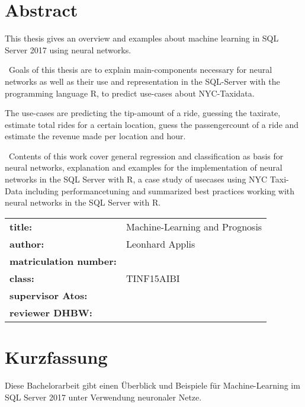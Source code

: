 \chapter*{Abstract} %
This thesis gives an overview and examples about machine learning in SQL Server 2017 using neural networks. 

~\newline Goals of this thesis are to explain main-components necessary for neural networks as well as their use and representation in the SQL-Server with the programming language R, to predict use-cases about NYC-Taxidata. 

The use-cases are predicting the tip-amount of a ride, guessing the taxirate, estimate total rides for a certain location, guess the passengercount of a ride and estimate the revenue made per location and hour.

~\newline Contents of this work cover general regression and classification as basis for neural networks, explanation and examples for the implementation of neural networks in the SQL Server with R, a case study of usecases using NYC Taxi-Data including performancetuning and summarized best practices working with neural networks in the SQL Server with R. 
~\newline
~\newline
\begin{flushleft}
	\begin{tabular}{ll}
		\textbf{title:} &\quad Machine-Learning and Prognosis \\
		\textbf{author:}  &\quad Leonhard Applis \\
		\textbf{matriculation number:} &\quad 2086307 \\
		\textbf{class:} &\quad TINF15AIBI \\
		\textbf{supervisor Atos:} & \quad \betreuerfirma \\
		\textbf{reviewer DHBW:} &\quad \betreuerdhbw \\
		[6ex]%
	\end{tabular} 
\end{flushleft}


\chapter*{Kurzfassung} 
Diese Bachelorarbeit gibt einen Überblick und Beispiele für Machine-Learning im SQL Server 2017 unter Verwendung neuronaler Netze.


